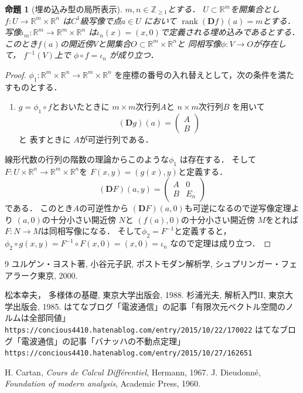 \documentclass[leqno, a4paper, 12pt]{jsarticle}
\newtheorem{prop}[thm]{命題}
\newcommand{\zz}{\mathbb{Z}}
\newcommand{\rr}{\mathbb{R}}
\DeclareMathOperator{\rank}{rank}
\newcommand{\ddd}{\mathbf{D}}
\begin{document}
\begin{prop}[埋め込み型の局所表示]
$m, n\in \zz_{\ge 1}$とする．
$U\subset \rr^{m}$を開集合とし
$f: U\to \rr^{m}\times \rr^{n}$
は$C^{1}$級写像で点$a\in U$
において
$\rank(\ddd f)(a)=m$とする．
写像$\iota_{m}: \rr^{m}\to \rr^{m}\times \rr^{n}$
は$\iota_{n}(x)=(x, 0)$で定義される埋め込みであるとする．
このとき$f(a)$の開近傍$V$と開集合$O\subset \rr^{m}
\times \rr^{n}$と
同相写像$\phi: V\to O$が存在して，
$f^{-1}(V)$上で
$\phi\circ f=\iota_{n}$
が成り立つ．
\end{prop}
\begin{proof}
$\phi_{1}: \rr^{m}\times \rr^{n}\to \rr^{m}\times \rr^{n}$
を座標の番号の入れ替えとして，次の条件を満たすものとする．
\begin{enumerate}
\item 
$g= \phi_{1}\circ f$とおいたときに
$m\times m$次行列$A$と
$n\times m$次行列$B$
を用いて
\[
(\ddd g)(a)=
\begin{pmatrix}
A\\
B
\end{pmatrix}
\]と
表すときに
$A$が可逆行列である．
\end{enumerate}
線形代数の行列の階数の理論からこのような$\phi_{1}$
は存在する．
そして
$F:U\times \rr^{n}\to \rr^{m}\times \rr^{n}$を
$F(x, y)=(g(x), y)$と定義する．
\[
(\ddd F)(a, y)=
\begin{pmatrix}
A & 0\\
B & E_{n}
\end{pmatrix}
\]
である．
このとき$A$の可逆性から
$(\ddd F)(a, 0)$も可逆になるので逆写像定理より
$(a, 0)$の十分小さい開近傍
$N$と
$(f(a), 0)$の十分小さい開近傍
$M$をとれば$F: N\to M$は同相写像になる．
そして$\phi_{2}=F^{-1}$と定義すると，
$\phi_{2}\circ g(x, y)=
F^{-1}\circ F(x, 0)=(x, 0)=\iota_{n}$
なので定理は成り立つ．
\end{proof}


\begin{thebibliography}{9}
ユルゲン・ヨスト著, 
小谷元子訳,
ポストモダン解析学, 
シュプリンガー・フェアラーク東京, 
2000. 

松本幸夫，
多様体の基礎, 
東京大学出版会, 
1988. 
杉浦光夫, 
解析入門II, 
東京大学出版会, 
1985. 
はてなブログ「電波通信」の記事「有限次元ベクトル空間のノルムは全部同値」
\verb|https://concious4410.hatenablog.com/entry/2015/10/22/170022|
はてなブログ「電波通信」の記事「バナッハの不動点定理」
\verb|https://concious4410.hatenablog.com/entry/2015/10/27/162651|

H. Cartan, 
\textit{Cours de Calcul Diff\'{e}rentiel}, 
Hermann, 1967. 
J. Dieudonn\'{e}, 
\textit{Foundation of modern analysis}, 
Academic Press, 1960. 
\end{thebibliography}




			
\end{document}
